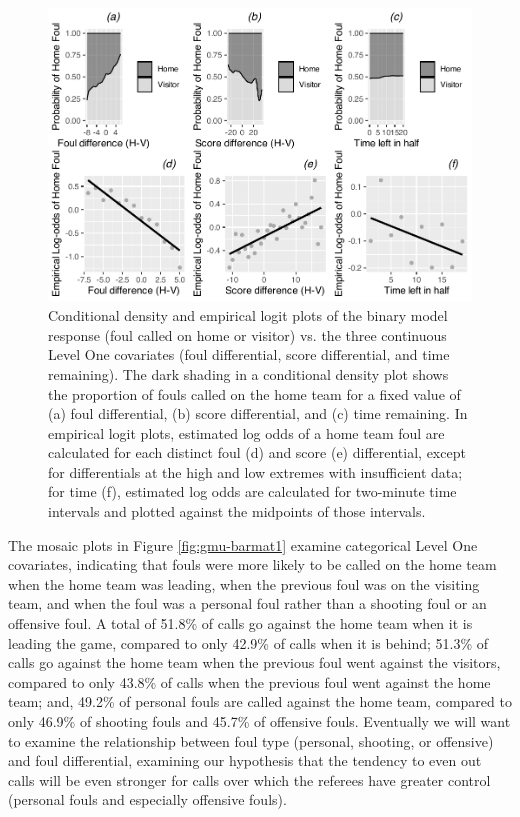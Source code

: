 \documentclass[
]{krantz}
\begin{document}
\begin{figure}

{\centering \includegraphics[width=0.6\linewidth]{bookdown-BeyondMLR_files/figure-latex/gmu-cdelogitmat1-1} 

}

\caption{Conditional density and empirical logit plots of the binary model response (foul called on home or visitor) vs. the three continuous Level One covariates (foul differential, score differential, and time remaining).  The dark shading in a conditional density plot shows the proportion of fouls called on the home team for a fixed value of (a) foul differential, (b) score differential, and (c) time remaining.  In empirical logit plots, estimated log odds of a home team foul are calculated for each distinct foul (d) and score (e) differential, except for differentials at the high and low extremes with insufficient data; for time (f), estimated log odds are calculated for two-minute time intervals and plotted against the midpoints of those intervals.}\label{fig:gmu-cdelogitmat1}
\end{figure}

The mosaic plots in Figure \ref{fig:gmu-barmat1} examine categorical Level One covariates, indicating that fouls were more likely to be called on the home team when the home team was leading, when the previous foul was on the visiting team, and when the foul was a personal foul rather than a shooting foul or an offensive foul. A total of 51.8\% of calls go against the home team when it is leading the game, compared to only 42.9\% of calls when it is behind; 51.3\% of calls go against the home team when the previous foul went against the visitors, compared to only 43.8\% of calls when the previous foul went against the home team; and, 49.2\% of personal fouls are called against the home team, compared to only 46.9\% of shooting fouls and 45.7\% of offensive fouls. Eventually we will want to examine the relationship between foul type (personal, shooting, or offensive) and foul differential, examining our hypothesis that the tendency to even out calls will be even stronger for calls over which the referees have greater control (personal fouls and especially offensive fouls).
\end{document}
